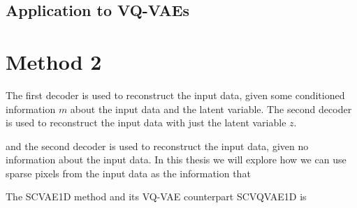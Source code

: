 \subsection{Application to VQ-VAEs}

\section{Method 2}


The first decoder is used to reconstruct the input data, given some conditioned information $m$ about the input data and the latent variable. The second decoder is used to reconstruct the input data with just the latent variable $z$.

and the second decoder is used to reconstruct the input data, given no information about the input data. In this thesis we will explore how we can use sparse pixels from the input data as the information that 

The SCVAE1D method and its VQ-VAE counterpart SCVQVAE1D is 





